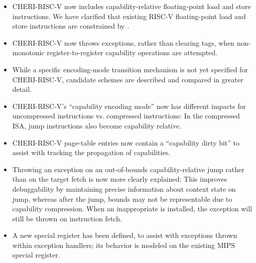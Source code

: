 \begin{itemize}
\item CHERI-RISC-V now includes capability-relative floating-point load and
  store instructions.
  We have clarified that existing RISC-V floating-point load and store
  instructions are constrained by \DDC{}.

\item CHERI-RISC-V now throws exceptions, rather than clearing tags, when
  non-mono\-tonic register-to-register capability operations are attempted.

\item While a specific encoding-mode transition mechanism is not yet specified
  for CHERI-RISC-V, candidate schemes are described and compared in greater
  detail.

\item CHERI-RISC-V's ``capability encoding mode'' now has different impacts
  for uncompressed instructions vs. compressed instructions: In the compressed
  ISA, jump instructions also become capability relative.

\item CHERI-RISC-V page-table entries now contain a ``capability dirty bit''
  to assist with tracking the propagation of capabilities.

\item Throwing an exception on an out-of-bounds capability-relative jump
  rather than on the target fetch is now more clearly explained: This improves
  debuggability by maintaining precise information about context state on
  jump, whereas after the jump, bounds may not be representable due to
  capability compression.
  When an inappropriate \EPCC{} is installed, the exception will still be
  thrown on instruction fetch.

\item A new \ErrorEPCC{} special register has been defined, to assist with
  exceptions thrown within exception handlers; its behavior is modeled on the
  existing MIPS \ErrorEPC{} special register.

\end{itemize}
